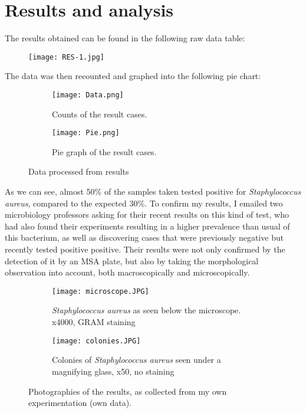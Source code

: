 \section{Results and analysis}
The results obtained can be found in the following raw data table:
\begin{center}\begin{figure}[H]\centering\texttt{[image: RES-1.jpg]}\end{figure}\end{center}
The data was then recounted and graphed into the following pie chart:
\begin{center}\begin{figure}[H]\centering\begin{subfigure}[b]{0.4\linewidth}\texttt{[image: Data.png]}\caption{Counts of the result cases.}\end{subfigure}\begin{subfigure}[b]{0.38\linewidth}\texttt{[image: Pie.png]}\caption{Pie graph of the result cases.}\end{subfigure}\caption{Data processed from results}\end{figure}\end{center}\vspace{-1.5em}
As we can see, almost 50\% of the samples taken tested positive for \emph{Staphylococcus aureus}, compared to the expected 30\%\cite{StaphylococcusAureusHealthcare2020}. To confirm my results, I emailed two microbiology professors asking for their recent results on this kind of test, who had also found their experiments resulting in a higher prevalence than usual of this bacterium, as well as discovering cases that were previously negative but recently tested positive positive. Their results were not only confirmed by the detection of it by an MSA plate, but also by taking the morphological observation into account, both macroscopically and microscopically.
\begin{figure}[H]\centering\begin{subfigure}[b]{0.4\linewidth}\texttt{[image: microscope.JPG]}\caption{\emph{Staphylococcus aureus} as seen below the microscope. x4000, GRAM staining}\end{subfigure}\begin{subfigure}[b]{0.4\linewidth}\texttt{[image: colonies.JPG]}\caption{Colonies of \emph{Staphylococcus aureus} seen under a magnifying glass, x50, no staining}\end{subfigure}\caption{Photographies of the results, as collected from my own experimentation (own data).}\end{figure}
